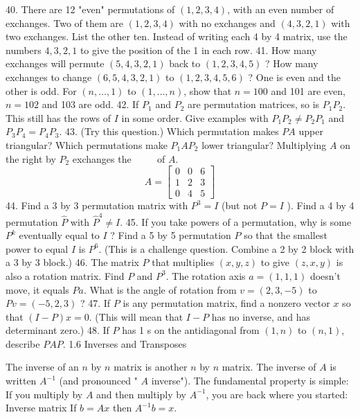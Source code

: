 
40. There are 12 "even" permutations of $(1,2,3,4)$, with an even number of exchanges. Two of them are $(1,2,3,4)$ with no exchanges and $(4,3,2,1)$ with two exchanges. List the other ten. Instead of writing each 4 by 4 matrix, use the numbers $4,3,2,1$ to give the position of the 1 in each row.
41. How many exchanges will permute $(5,4,3,2,1)$ back to $(1,2,3,4,5)$ ? How many exchanges to change $(6,5,4,3,2,1)$ to $(1,2,3,4,5,6)$ ? One is even and the other is odd. For $(n, \ldots, 1)$ to $(1, \ldots, n)$, show that $n=100$ and 101 are even, $n=102$ and 103 are odd.
42. If $P_1$ and $P_2$ are permutation matrices, so is $P_1 P_2$. This still has the rows of $I$ in some order. Give examples with $P_1 P_2 \neq P_2 P_1$ and $P_3 P_4=P_4 P_3$.
43. (Try this question.) Which permutation makes $P A$ upper triangular? Which permutations make $P_1 A P_2$ lower triangular? Multiplying $A$ on the right by $P_2$ exchanges the $\qquad$ of $A$.
$$
A=\left[\begin{array}{lll}
0 & 0 & 6 \\
1 & 2 & 3 \\
0 & 4 & 5
\end{array}\right]
$$
44. Find a 3 by 3 permutation matrix with $P^3=I$ (but not $P=I$ ). Find a 4 by 4 permutation $\widehat{P}$ with $\widehat{P}^4 \neq I$.
45. If you take powers of a permutation, why is some $P^k$ eventually equal to $I$ ? Find a 5 by 5 permutation $P$ so that the smallest power to equal $I$ is $P^6$. (This is a challenge question. Combine a 2 by 2 block with a 3 by 3 block.)
46. The matrix $P$ that multiplies $(x, y, z)$ to give $(z, x, y)$ is also a rotation matrix. Find $P$ and $P^3$. The rotation axis $a=(1,1,1)$ doesn't move, it equals $P a$. What is the angle of rotation from $v=(2,3,-5)$ to $P v=(-5,2,3)$ ?
47. If $P$ is any permutation matrix, find a nonzero vector $x$ so that $(I-P) x=0$. (This will mean that $I-P$ has no inverse, and has determinant zero.)
48. If $P$ has 1 s on the antidiagonal from $(1, n)$ to $(n, 1)$, describe $P A P$.
1.6 Inverses and Transposes

The inverse of an $n$ by $n$ matrix is another $n$ by $n$ matrix. The inverse of $A$ is written $A^{-1}$ (and pronounced " $A$ inverse"). The fundamental property is simple: If you multiply by $A$ and then multiply by $A^{-1}$, you are back where you started:
Inverse matrix If $b=A x$ then $A^{-1} b=x$.
